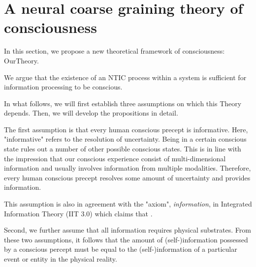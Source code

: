 \documentclass[utf8]{article}
\begin{document}



	\section{A neural coarse graining theory of consciousness}\label{sec:OurTheory}
	


        In this section, we propose a new theoretical framework of consciousness: \acf{OurTheory}.
        
        We argue that the existence of an NTIC process within a system is sufficient for information processing to be conscious.

        In what follows, we will first establish three assumptions on which this Theory depends. Then, we will develop the propositions in detail. 
    
        The first assumption is that every human conscious precept is informative. Here, "informative" refers to the resolution of uncertainty. Being in a certain conscious state rules out a  number of other possible conscious states. This is in line with the impression that our conscious experience consist of multi-dimensional information and usually involves information from multiple modalities. Therefore, every human conscious precept resolves some amount of uncertainty and provides information.  
        
        This assumption is also in agreement with the "axiom", \textit{information}, in Integrated Information Theory (IIT 3.0) which claims that  \citep[p. 2]{oizumi2014phenomenology}.
        
        Second, we further assume that all information requires physical substrates. 
        From these two assumptions, it follows that the amount of (self-)information possessed by a conscious percept must be equal to the (self-)information of a particular event or entity in the physical reality. 
        
\end{document}
